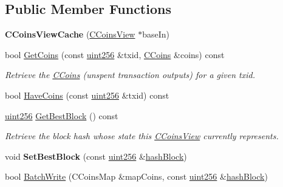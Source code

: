 \subsection*{Public Member Functions}
\begin{DoxyCompactItemize}
\item 
\mbox{\label{class_c_coins_view_cache_a515a6f259af607fb3394b560d9c063c9}} 
{\bfseries C\+Coins\+View\+Cache} (\mbox{\hyperlink{class_c_coins_view}{C\+Coins\+View}} $\ast$base\+In)
\item 
\mbox{\label{class_c_coins_view_cache_a1b62444593fdb580bfa4bd6fab41fafa}} 
bool \mbox{\hyperlink{class_c_coins_view_cache_a1b62444593fdb580bfa4bd6fab41fafa}{Get\+Coins}} (const \mbox{\hyperlink{classuint256}{uint256}} \&txid, \mbox{\hyperlink{class_c_coins}{C\+Coins}} \&coins) const
\begin{DoxyCompactList}\small\item\em Retrieve the \mbox{\hyperlink{class_c_coins}{C\+Coins}} (unspent transaction outputs) for a given txid. \end{DoxyCompactList}\item 
bool \mbox{\hyperlink{class_c_coins_view_cache_aa8f0c55b6fc207d2188948a565125ab7}{Have\+Coins}} (const \mbox{\hyperlink{classuint256}{uint256}} \&txid) const
\item 
\mbox{\label{class_c_coins_view_cache_a1190c94a943c067d13211179ef06470b}} 
\mbox{\hyperlink{classuint256}{uint256}} \mbox{\hyperlink{class_c_coins_view_cache_a1190c94a943c067d13211179ef06470b}{Get\+Best\+Block}} () const
\begin{DoxyCompactList}\small\item\em Retrieve the block hash whose state this \mbox{\hyperlink{class_c_coins_view}{C\+Coins\+View}} currently represents. \end{DoxyCompactList}\item 
\mbox{\label{class_c_coins_view_cache_aa3f787f77b123f0fd340fbe4e458b4ad}} 
void {\bfseries Set\+Best\+Block} (const \mbox{\hyperlink{classuint256}{uint256}} \&\mbox{\hyperlink{class_c_coins_view_cache_a229dddddbc5501edc250209a2ce5df8b}{hash\+Block}})
\item 
bool \mbox{\hyperlink{class_c_coins_view_cache_a561bb7c6c97701b12c48fbbb563d0a91}{Batch\+Write}} (C\+Coins\+Map \&map\+Coins, const \mbox{\hyperlink{classuint256}{uint256}} \&\mbox{\hyperlink{class_c_coins_view_cache_a229dddddbc5501edc250209a2ce5df8b}{hash\+Block}})

\end{DoxyCompactItemize}
